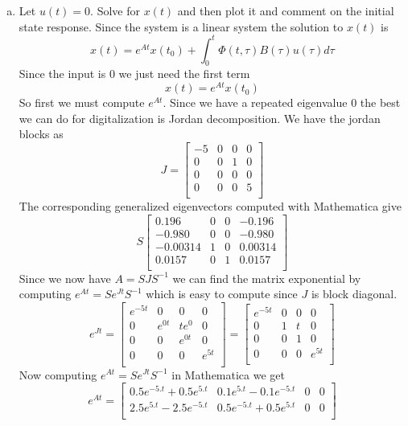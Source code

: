 \documentclass{article}
\begin{document}
\begin{enumerate}[(a)]
\item Let $u(t) = 0$. Solve for $x(t)$ and then plot it and comment on the initial state response.
\newline
\newline
Since the system is a linear system the solution to $x(t)$ is
$$ x(t) = e^{A t} x(t_0) + \int_0^t \Phi(t,\tau)B(\tau)u(\tau)d\tau $$
Since the input is $0$ we just need the first term
$$ x(t) = e^{A t} x(t_0) $$
So first we must compute $e^{A t}$.
Since we have a repeated eigenvalue $0$ the best we can do for digitalization is Jordan decomposition.
We have the jordan blocks as
$$
J=
\begin{bmatrix}
-5& 0 & 0 & 0 \\
0 & 0 & 1 & 0 \\
0 & 0 & 0 & 0 \\
0 & 0 & 0 & 5 \\
\end{bmatrix}
$$
The corresponding generalized eigenvectors computed with Mathematica give
$$
S
\begin{bmatrix}
0.196 & 0 & 0 & -0.196 \\
-0.980 & 0 & 0 & -0.980 \\
-0.00314 & 1 & 0 & 0.00314 \\
0.0157 & 0 & 1 & 0.0157 \\
\end{bmatrix}
$$
Since we now have $A = SJS^{-1}$ we can find the matrix exponential by computing $e^{A t} = Se^{J t}S^{-1}$ which is easy to compute since $J$ is block diagonal.
$$
e^{J t} =
\begin{bmatrix}
e^{-5 t} & 0 & 0 & 0 \\
0 & e^{0t} & te^{0} & 0 \\
0 & 0 & e^{0 t} & 0 \\
0 & 0 & 0 & e^{5 t} \\
\end{bmatrix}
=
\begin{bmatrix}
e^{-5 t} & 0 & 0 & 0 \\
0 & 1 & t & 0 \\
0 & 0 & 1 & 0 \\
0 & 0 & 0 & e^{5 t} \\
\end{bmatrix}
$$
Now computing $e^{A t} = S e^{J t} S^{-1}$ in Mathematica we get
$$
e^{A t} =
\begin{bmatrix}
0.5 e^{-5. t}+0.5 e^{5. t} & 0.1 e^{5. t}-0.1 e^{-5. t} & 0 & 0 \\
2.5 e^{5. t}-2.5 e^{-5. t} & 0.5 e^{-5. t}+0.5 e^{5. t} & 0 & 0 \\

\end{bmatrix}$$
\end{enumerate}
\end{document}

